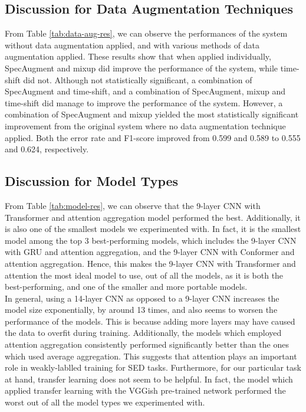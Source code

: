 \subsection{Discussion for Data Augmentation Techniques}
From Table \ref{tab:data-aug-res}, we can observe the performances of the system without data augmentation applied, and with various methods of data augmentation applied. These results show that when applied individually, SpecAugment and mixup did improve the performance of the system, while time-shift did not. Although not statistically significant, a combination of SpecAugment and time-shift, and a combination of SpecAugment, mixup and time-shift did manage to improve the performance of the system. However, a combination of SpecAugment and mixup yielded the most statistically significant improvement from the original system where no data augmentation technique applied. Both the error rate and F1-score improved from 0.599 and 0.589 to 0.555 and 0.624, respectively.

\subsection{Discussion for Model Types}
From Table \ref{tab:model-res}, we can observe that the 9-layer CNN with Transformer and attention aggregation model performed the best. Additionally, it is also one of the smallest models we experimented with. In fact, it is the smallest model among the top 3 best-performing models, which includes the 9-layer CNN with GRU and attention aggregation, and the 9-layer CNN with Conformer and attention aggregation. Hence, this makes the 9-layer CNN with Transformer and attention the most ideal model to use, out of all the models, as it is both the best-performing, and one of the smaller and more portable models.\\

In general, using a 14-layer CNN as opposed to a 9-layer CNN increases the model size exponentially, by around 13 times, and also seems to worsen the performance of the models. This is because adding more layers may have caused the data to overfit during training. Additionally, the models which employed attention aggregation consistently performed significantly better than the ones which used average aggregation. This suggests that attention plays an important role in weakly-lablled training for SED tasks. Furthermore, for our particular task at hand, transfer learning does not seem to be helpful. In fact, the model which applied transfer learning with the VGGish pre-trained network performed the worst out of all the model types we experimented with.

